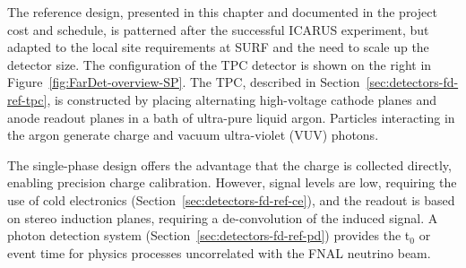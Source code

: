 The reference design, presented in this chapter and documented in the
project cost and schedule, is patterned after the successful ICARUS
experiment, but adapted to the local site requirements at SURF and the
need to scale up the detector size. The configuration of the TPC
detector is shown on the right in Figure~\ref{fig:FarDet-overview-SP}.
The TPC, described in Section~\ref{sec:detectors-fd-ref-tpc}, is
constructed by placing alternating high-voltage cathode planes and
anode readout planes in a bath of ultra-pure liquid argon. Particles
interacting in the argon generate charge and vacuum ultra-violet (VUV)
photons.


The single-phase design offers the advantage that the charge is
collected directly, enabling precision charge calibration. However,
signal levels are low, requiring the use of cold electronics
(Section~\ref{sec:detectors-fd-ref-ce}), and the readout is based on
stereo induction planes, requiring a de-convolution of the induced
signal. A photon detection system
(Section~\ref{sec:detectors-fd-ref-pd}) provides the t$_0$ or event
time for physics processes uncorrelated with the FNAL neutrino beam.


